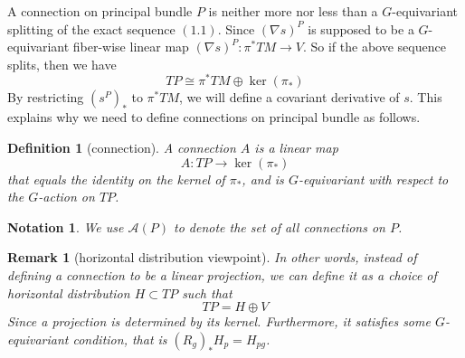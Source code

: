 \documentclass[11pt]{amsart}
\numberwithin{equation}{section}
\theoremstyle{plain}
\theoremstyle{plain}
\newtheorem{defnsub}[thmsub]{Definition}
\newtheorem{remksub}[thmsub]{Remark}
\newtheorem{notasub}[thmsub]{Notation}
\numberwithin{equation}{section}
\begin{document}
A connection on principal bundle $P$ is neither more nor less than a $G$-equivariant splitting of the exact sequence $(1.1)$. Since $(\nabla s)^P$ is supposed to be a $G$-equivariant fiber-wise linear map $(\nabla s)^P:\pi^*TM\to V$. So if the above sequence splits, then we have
$$
TP\cong\pi^*TM\oplus\operatorname{ker}(\pi_*)
$$
By restricting $(s^P)_*$ to $\pi^*TM$, we will define a covariant derivative of $s$. This explains why we need to define connections on principal bundle as follows.

\begin{defnsub}[connection]
A connection $A$ is a linear map
$$
A:TP\to\operatorname{ker}(\pi_*)
$$
that equals the identity on the kernel of $\pi_*$, and is $G$-equivariant with respect to the $G$-action on $TP$. 
\end{defnsub}
\begin{notasub}\normalfont
We use $\mathscr{A}(P)$ to denote the set of all connections on $P$.
\end{notasub}
\begin{remksub}[horizontal distribution viewpoint]\normalfont
In other words, instead of defining a connection to be a linear projection, we can define it as a choice of horizontal distribution $H\subset TP$ such that
$$
TP=H\oplus V
$$
Since a projection is determined by its kernel. Furthermore, it satisfies some $G$-equivariant condition, that is $(R_g)_*H_p=H_{pg}$.
\end{remksub}
\end{document}
